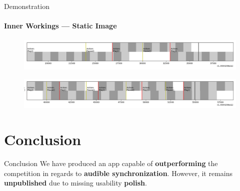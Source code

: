 \begin{frame}{Demonstration}
    \framesubtitle{Inner Workings --- Static Image}
    \begin{figure}
        \centering
        \includegraphics[width=1\textwidth]{images/log_viz_1.png}
    \end{figure}
    \begin{figure}
        \centering
        \includegraphics[width=1\textwidth]{images/log_viz_2.png}
    \end{figure}
\end{frame}

\section{Conclusion}

\begin{frame}{Conclusion}
    We have produced an app capable of \textbf{outperforming} the competition in regards to \textbf{audible synchronization}.
    However, it remains \textbf{unpublished} due to missing usability \textbf{polish}.
\end{frame}

